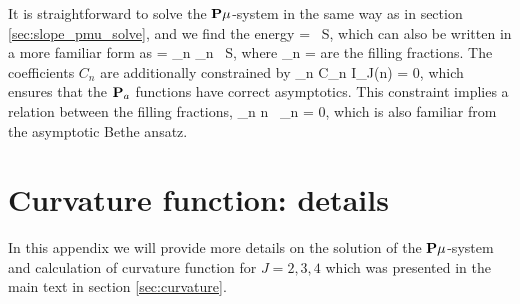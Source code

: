 It is straightforward to solve the ${\bf P}\mu$-system in the same way as in section \ref{sec:slope_pmu_solve}, and we find the energy
\beq
	\gamma =   \, S,
\eeq
which can also be written in a more familiar form as
\beq
	\gamma = \sum_n \alpha_n   \, S,
\eeq
where
\beq
	\alpha_n = 
\eeq
are the filling fractions.
The coefficients $C_n$ are additionally constrained by
\beq
	\sum_n C_n I_J(n\sqrt{\lambda}) = 0,
\eeq
which ensures that the ${\bf P}_a$ functions have correct asymptotics. This constraint implies a relation between the filling fractions,
\beq
	\sum_n n \, \alpha_n = 0,
\eeq
which is also familiar from the asymptotic Bethe ansatz.


\section{Curvature function: details}
\label{sec:NLOapp}

In this appendix we will provide more details on the solution of the ${\bf P}\mu$-system and calculation of curvature function for $J=2,3,4$ which was presented in the main text in section \ref{sec:curvature}.


